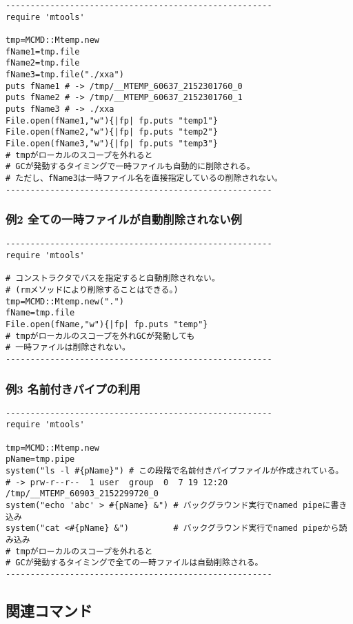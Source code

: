\documentclass[a4paper]{jarticle}
\begin{document}
\begin{verbatim}
------------------------------------------------------
require 'mtools'

tmp=MCMD::Mtemp.new
fName1=tmp.file
fName2=tmp.file
fName3=tmp.file("./xxa")
puts fName1 # -> /tmp/__MTEMP_60637_2152301760_0
puts fName2 # -> /tmp/__MTEMP_60637_2152301760_1
puts fName3 # -> ./xxa
File.open(fName1,"w"){|fp| fp.puts "temp1"}
File.open(fName2,"w"){|fp| fp.puts "temp2"}
File.open(fName3,"w"){|fp| fp.puts "temp3"}
# tmpがローカルのスコープを外れると
# GCが発動するタイミングで一時ファイルも自動的に削除される。
# ただし、fName3は一時ファイル名を直接指定しているの削除されない。
------------------------------------------------------
\end{verbatim}

\subsubsection*{例2 全ての一時ファイルが自動削除されない例}
\begin{verbatim}
------------------------------------------------------
require 'mtools'

# コンストラクタでパスを指定すると自動削除されない。
# (rmメソッドにより削除することはできる。)
tmp=MCMD::Mtemp.new(".")
fName=tmp.file
File.open(fName,"w"){|fp| fp.puts "temp"}
# tmpがローカルのスコープを外れGCが発動しても
# 一時ファイルは削除されない。
------------------------------------------------------
\end{verbatim}

\subsubsection*{例3 名前付きパイプの利用}
\begin{verbatim}
------------------------------------------------------
require 'mtools'

tmp=MCMD::Mtemp.new
pName=tmp.pipe
system("ls -l #{pName}") # この段階で名前付きパイプファイルが作成されている。
# -> prw-r--r--  1 user  group  0  7 19 12:20 /tmp/__MTEMP_60903_2152299720_0
system("echo 'abc' > #{pName} &") # バックグラウンド実行でnamed pipeに書き込み
system("cat <#{pName} &")         # バックグラウンド実行でnamed pipeから読み込み
# tmpがローカルのスコープを外れると
# GCが発動するタイミングで全ての一時ファイルは自動削除される。
------------------------------------------------------
\end{verbatim}

\subsection*{関連コマンド}

\end{document}
